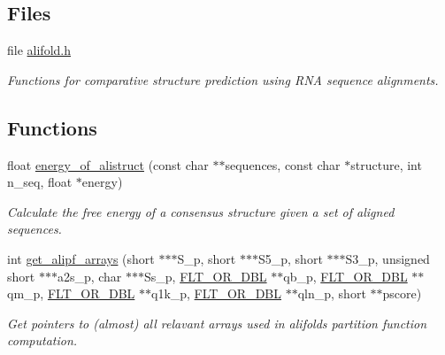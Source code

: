 \subsection*{Files}
\begin{DoxyCompactItemize}
\item 
file \hyperlink{alifold_8h}{alifold.\+h}
\begin{DoxyCompactList}\small\item\em Functions for comparative structure prediction using R\+NA sequence alignments. \end{DoxyCompactList}\end{DoxyCompactItemize}
\subsection*{Functions}
\begin{DoxyCompactItemize}
\item 
float \hyperlink{group__consensus__fold_ga1c48869c03b49a342bf4cbdd61900081}{energy\+\_\+of\+\_\+alistruct} (const char $\ast$$\ast$sequences, const char $\ast$structure, int n\+\_\+seq, float $\ast$energy)
\begin{DoxyCompactList}\small\item\em Calculate the free energy of a consensus structure given a set of aligned sequences. \end{DoxyCompactList}\item 
int \hyperlink{group__consensus__fold_ga5349960075b1847720a2e9df021e2675}{get\+\_\+alipf\+\_\+arrays} (short $\ast$$\ast$$\ast$S\+\_\+p, short $\ast$$\ast$$\ast$S5\+\_\+p, short $\ast$$\ast$$\ast$S3\+\_\+p, unsigned short $\ast$$\ast$$\ast$a2s\+\_\+p, char $\ast$$\ast$$\ast$Ss\+\_\+p, \hyperlink{group__data__structures_ga31125aeace516926bf7f251f759b6126}{F\+L\+T\+\_\+\+O\+R\+\_\+\+D\+BL} $\ast$$\ast$qb\+\_\+p, \hyperlink{group__data__structures_ga31125aeace516926bf7f251f759b6126}{F\+L\+T\+\_\+\+O\+R\+\_\+\+D\+BL} $\ast$$\ast$qm\+\_\+p, \hyperlink{group__data__structures_ga31125aeace516926bf7f251f759b6126}{F\+L\+T\+\_\+\+O\+R\+\_\+\+D\+BL} $\ast$$\ast$q1k\+\_\+p, \hyperlink{group__data__structures_ga31125aeace516926bf7f251f759b6126}{F\+L\+T\+\_\+\+O\+R\+\_\+\+D\+BL} $\ast$$\ast$qln\+\_\+p, short $\ast$$\ast$pscore)
\begin{DoxyCompactList}\small\item\em Get pointers to (almost) all relavant arrays used in alifold\textquotesingle{}s partition function computation. \end{DoxyCompactList}\item 

\end{DoxyCompactItemize}
